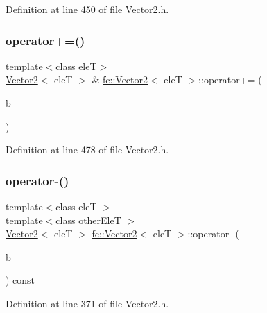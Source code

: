 Definition at line 450 of file Vector2.\+h.

\mbox{\label{classfc_1_1Vector2_a226e562bb44d66cb24803dc79993910c}} 
\subsubsection{\texorpdfstring{operator+=()}{operator+=()}\hspace{0.1cm}{\footnotesize\ttfamily [2/2]}}
{\footnotesize\ttfamily template$<$class eleT$>$ \\
\hyperlink{classfc_1_1Vector2}{Vector2}$<$ eleT $>$ \& \hyperlink{classfc_1_1Vector2}{fc\+::\+Vector2}$<$ eleT $>$\+::operator+= (\begin{DoxyParamCaption}\item[{eleT}]{b }\end{DoxyParamCaption})}



Definition at line 478 of file Vector2.\+h.

\mbox{\label{classfc_1_1Vector2_a7e15b16fc37078fdf982b7ba9753d6d8}} 
\subsubsection{\texorpdfstring{operator-\/()}{operator-()}\hspace{0.1cm}{\footnotesize\ttfamily [1/2]}}
{\footnotesize\ttfamily template$<$class eleT $>$ \\
template$<$class other\+EleT $>$ \\
\hyperlink{classfc_1_1Vector2}{Vector2}$<$ eleT $>$ \hyperlink{classfc_1_1Vector2}{fc\+::\+Vector2}$<$ eleT $>$\+::operator-\/ (\begin{DoxyParamCaption}\item[{const \hyperlink{classfc_1_1Vector2}{Vector2}$<$ other\+EleT $>$ \&}]{b }\end{DoxyParamCaption}) const}



Definition at line 371 of file Vector2.\+h.

\mbox{\label{classfc_1_1Vector2_ab5f7abbdd873f2a1bd149b7df7ad04b1}} 
